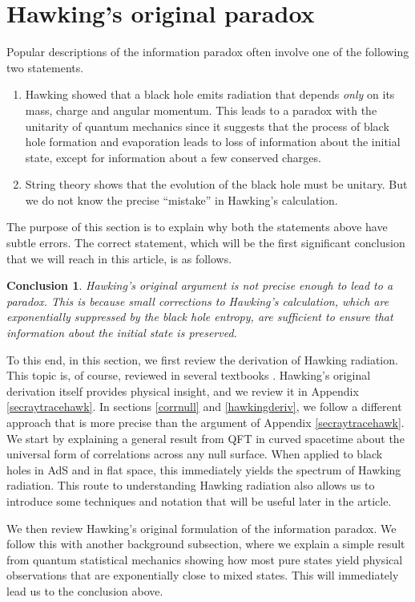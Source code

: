 \documentclass[12pt]{article}
\newtheorem{lesson}{Conclusion}
\begin{document}
\section{Hawking's original paradox \label{secoldinfo}}
Popular descriptions of the information paradox often involve one of the following two statements.
\begin{enumerate}
\item[1.]
Hawking showed that a black hole emits radiation that depends {\em only} on its mass, charge and angular momentum.  This leads to a paradox with the unitarity of quantum mechanics since it suggests that the process of black hole formation and evaporation leads to loss of  information about the initial state, except for information about a few conserved charges.
\item[2.]
String theory shows that the evolution of the black hole must be unitary. But we do not know the precise ``mistake'' in Hawking's calculation.
\end{enumerate}
The purpose of this section is to explain why both the statements above have subtle errors. The correct statement, which will be the first significant conclusion that we will reach in this article, is as follows.
\begin{lesson}
\label{lessonone}
Hawking's original argument is not precise enough to lead to a paradox. This is because small corrections to Hawking's calculation, which are exponentially suppressed by the black hole entropy, are sufficient to ensure that information about the initial state is preserved.  \end{lesson}

To this end, in this section, we first review the derivation of Hawking radiation. This topic is, of course, reviewed in several textbooks \cite{birrell1984quantum,wald1994quantum}. Hawking's original derivation itself provides physical insight, and we review it in Appendix \ref{secraytracehawk}. In sections \ref{corrnull} and \ref{hawkingderiv},  we follow a different approach that  is more precise than the argument of Appendix \ref{secraytracehawk}.  We start by explaining a general result from QFT in curved spacetime about the universal form of correlations across any null surface. When applied to black holes in AdS and in flat space, this immediately yields the spectrum of Hawking radiation. This route to understanding Hawking radiation also allows us to introduce some techniques and notation that will be useful later in the article. 

We then review Hawking's original formulation of the information paradox. We follow this with another background subsection, where we explain a simple result from quantum statistical mechanics showing how most pure states yield physical observations that are exponentially close to mixed states. This will immediately lead us to the conclusion above.
\end{document}
